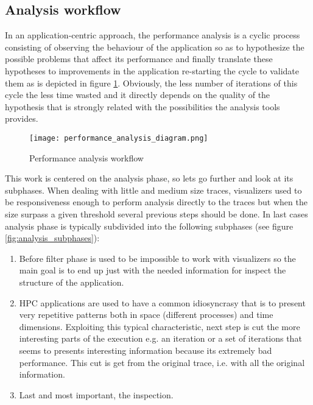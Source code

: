 \subsection{Analysis workflow}\label{ss:analysis_workflow}

In an application-centric approach, the performance analysis is a cyclic process 
consisting of observing the behaviour of the application so as to hypothesize the 
possible problems that affect its performance and finally translate these 
hypotheses to improvements in the application re-starting the cycle to validate 
them as is depicted in figure \ref{fig:perf_analysis_workflow}. Obviously, the 
less number of iterations of this cycle the less time wasted and it directly 
depends on the quality of the hypothesis that is strongly related with the 
possibilities the analysis tools provides.

\begin{figure}[]
  \centering
  \texttt{[image: performance\_analysis\_diagram.png]}
  \caption{Performance analysis workflow}
  \label{fig:perf_analysis_workflow}
\end{figure}

This work is centered on the analysis phase, so lets go further and look at its
subphases. When dealing with little and medium size traces, visualizers used to
be responsiveness enough to perform analysis directly to the traces but when the 
size surpass a given threshold several previous steps should be done. In last 
cases analysis phase is typically subdivided into the following 
subphases (see figure \ref{fig:analysis_subphases}):
\begin{enumerate}[label=\roman*)]
  \item Before filter phase is
    used to be impossible to work with visualizers so the main goal is to end up
    just with the needed information for inspect the structure of the
    application.
  \item HPC applications are used to have a common idiosyncrasy that is to
    present very repetitive patterns both in space (different processes) and 
    time dimensions. Exploiting this typical characteristic, next step is cut
    the more interesting parts of the execution e.g. an iteration or a set of
    iterations that seems to presents interesting information because its 
    extremely bad performance. This cut is get from the original trace, i.e.
    with all the original information.
  \item Last and most important, the inspection. 
\end{enumerate}

